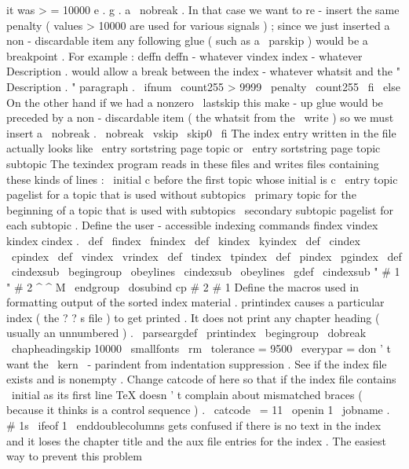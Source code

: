 {{{it
was
>
=
10000
e
.
g
.
a
\
nobreak
.
In
that
case
we
want
%
to
re
-
insert
the
same
penalty
(
values
>
10000
are
used
for
various
%
signals
)
;
since
we
just
inserted
a
non
-
discardable
item
any
%
following
glue
(
such
as
a
\
parskip
)
would
be
a
breakpoint
.
For
example
:
%
%
deffn
deffn
-
whatever
%
vindex
index
-
whatever
%
Description
.
%
would
allow
a
break
between
the
index
-
whatever
whatsit
%
and
the
"
Description
.
"
paragraph
.
\
ifnum
\
count255
>
9999
\
penalty
\
count255
\
fi
\
else
%
On
the
other
hand
if
we
had
a
nonzero
\
lastskip
%
this
make
-
up
glue
would
be
preceded
by
a
non
-
discardable
item
%
(
the
whatsit
from
the
\
write
)
so
we
must
insert
a
\
nobreak
.
\
nobreak
\
vskip
\
skip0
\
fi
}
%
The
index
entry
written
in
the
file
actually
looks
like
%
\
entry
{
sortstring
}
{
page
}
{
topic
}
%
or
%
\
entry
{
sortstring
}
{
page
}
{
topic
}
{
subtopic
}
%
The
texindex
program
reads
in
these
files
and
writes
files
%
containing
these
kinds
of
lines
:
%
\
initial
{
c
}
%
before
the
first
topic
whose
initial
is
c
%
\
entry
{
topic
}
{
pagelist
}
%
for
a
topic
that
is
used
without
subtopics
%
\
primary
{
topic
}
%
for
the
beginning
of
a
topic
that
is
used
with
subtopics
%
\
secondary
{
subtopic
}
{
pagelist
}
%
for
each
subtopic
.
%
Define
the
user
-
accessible
indexing
commands
%
findex
vindex
kindex
cindex
.
\
def
\
findex
{
\
fnindex
}
\
def
\
kindex
{
\
kyindex
}
\
def
\
cindex
{
\
cpindex
}
\
def
\
vindex
{
\
vrindex
}
\
def
\
tindex
{
\
tpindex
}
\
def
\
pindex
{
\
pgindex
}
\
def
\
cindexsub
{
\
begingroup
\
obeylines
\
cindexsub
}
{
\
obeylines
%
\
gdef
\
cindexsub
"
#
1
"
#
2
^
^
M
{
\
endgroup
%
\
dosubind
{
cp
}
{
#
2
}
{
#
1
}
}
}
%
Define
the
macros
used
in
formatting
output
of
the
sorted
index
material
.
%
printindex
causes
a
particular
index
(
the
?
?
s
file
)
to
get
printed
.
%
It
does
not
print
any
chapter
heading
(
usually
an
unnumbered
)
.
%
\
parseargdef
\
printindex
{
\
begingroup
\
dobreak
\
chapheadingskip
{
10000
}
%
%
\
smallfonts
\
rm
\
tolerance
=
9500
\
everypar
=
{
}
%
don
'
t
want
the
\
kern
\
-
parindent
from
indentation
suppression
.
%
%
See
if
the
index
file
exists
and
is
nonempty
.
%
Change
catcode
of
here
so
that
if
the
index
file
contains
%
\
initial
{
}
%
as
its
first
line
TeX
doesn
'
t
complain
about
mismatched
braces
%
(
because
it
thinks
}
is
a
control
sequence
)
.
\
catcode
\
=
11
\
openin
1
\
jobname
.
#
1s
\
ifeof
1
%
\
enddoublecolumns
gets
confused
if
there
is
no
text
in
the
index
%
and
it
loses
the
chapter
title
and
the
aux
file
entries
for
the
%
index
.
The
easiest
way
to
prevent
this
problem
}}
